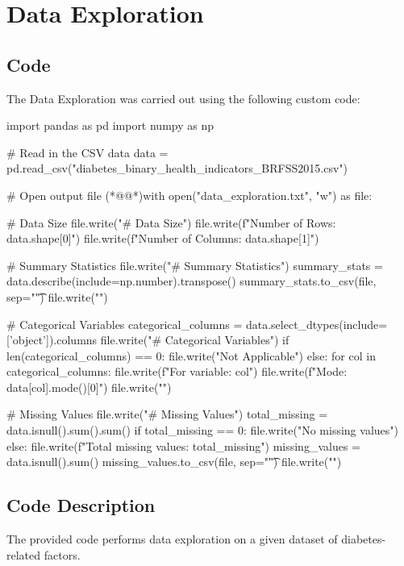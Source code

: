 \documentclass[11pt]{article}
\begin{document}
\section{Data Exploration}
\subsection{{Code}}
The Data Exploration was carried out using the following custom code:

\begin{python}

import pandas as pd
import numpy as np

# Read in the CSV data
data = pd.read_csv("diabetes_binary_health_indicators_BRFSS2015.csv")

# Open output file
(*@@*)with open("data_exploration.txt", "w") as file:

    # Data Size
    file.write("# Data Size\n")
    file.write(f"Number of Rows: {data.shape[0]}\n")
    file.write(f"Number of Columns: {data.shape[1]}\n\n")
    
    # Summary Statistics
    file.write("# Summary Statistics\n")
    summary_stats = data.describe(include=np.number).transpose()
    summary_stats.to_csv(file, sep="\t")
    file.write("\n")
    
    # Categorical Variables
    categorical_columns = data.select_dtypes(include=['object']).columns
    file.write("# Categorical Variables\n")
    if len(categorical_columns) == 0:
        file.write("Not Applicable\n\n")
    else:
        for col in categorical_columns:
            file.write(f"For variable: {col}\n")
            file.write(f"Mode: {data[col].mode()[0]}\n")
        file.write("\n")

    # Missing Values
    file.write("# Missing Values\n")
    total_missing = data.isnull().sum().sum()
    if total_missing == 0:
        file.write("No missing values\n\n")
    else:
        file.write(f"Total missing values: {total_missing}\n")
        missing_values = data.isnull().sum()
        missing_values.to_csv(file, sep="\t")
        file.write("\n")

\end{python}

\subsection{Code Description}

The provided code performs data exploration on a given dataset of diabetes-related factors. 
\end{document}
